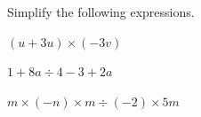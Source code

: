 Simplify the following expressions.

\begin{subparts}
  \item $(u+3u)\times(-3v)$
  \item $1+8a\div 4-3+2a$
  \item $m\times(-n)\times m\div(-2)\times 5m$
\end{subparts}

